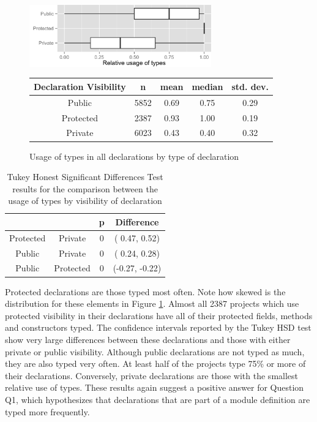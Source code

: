 \documentclass[msc]{ppgccufmg}
\renewcommand{\arraystretch}{1.2}
\begin{document}
\begin{figure}[h!]
\centering 
\includegraphics[width=0.7\textwidth]{../aosd_2014/analysis/result/all/boxplots/23_declarations_by_visibility.png} 


\vspace{0.3cm}

\renewcommand{\arraystretch}{1.2}

\begin{tabular}{|c|c|c|c|c|}
\hline
Declaration Visibility	& n		& mean	& median	& std. dev.	\\
\hline
\hline
Public    				& 5852	& 0.69	& 0.75		& 0.29		\\ \hline
Protected 				& 2387	& 0.93	& 1.00		& 0.19		\\ \hline
Private   				& 6023	& 0.43	& 0.40		& 0.32		\\ \hline
\end{tabular}
\caption{Usage of types in all declarations by type of declaration}
\label{fig:all_boxplot_visibility_all} 
\end{figure}

\begin{table}[h]

\centering{}%
\renewcommand{\arraystretch}{1.2}

\begin{tabular}{|c|c|c|c|}
\hline 
								& {}		& p		& Difference	\\
\hline
\hline
Protected & Private & 0 & ( 0.47,  0.52) \\ \hline
Public & Private & 0 & ( 0.24,  0.28) \\ \hline
Public & Protected & 0 & (-0.27, -0.22) \\ \hline
\end{tabular}
\caption{Tukey Honest Significant Differences Test results for the comparison between the usage of types by visibility of declaration}
\label{tab:all_utest_visibility}
\end{table}

Protected declarations are those typed most often.
Note how skewed is the distribution for these elements in Figure \ref{fig:all_boxplot_visibility_all}.
Almost all 2387 projects which use protected visibility in their declarations have all of their protected fields, methods and constructors typed.
The confidence intervals reported by the Tukey HSD test show very large differences between these declarations and those with either private or public visibility.
Although public declarations are not typed as much, they are also typed very often.
At least half of the projects type 75\% or more of their declarations.
Conversely, private declarations are those with the smallest relative use of types.
These results again suggest a positive answer for Question Q1, which hypothesizes that declarations that are part of a module definition are typed more frequently.
\end{document}
